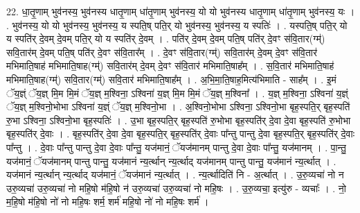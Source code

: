 \documentclass[17pt]{extarticle}
\begin{document}
22. धा॒तृ॒णाम् भुव॑नस्य॒ भुव॑नस्य धातृ॒णाम् धा॑तृ॒णाम् भुव॑नस्य॒ यो यो भुव॑नस्य धातृ॒णाम् धा॑तृ॒णाम् भुव॑नस्य॒ यः । . भुव॑नस्य॒ यो यो भुव॑नस्य॒ भुव॑नस्य॒ य स्पति॒ष् पति॒र् यो भुव॑नस्य॒ भुव॑नस्य॒ य स्पतिः॑ । . यस्पति॒ष् पति॒र् यो य स्पति॑र् दे॒वम् दे॒वम् पति॒र् यो य स्पति॑र् दे॒वम् । . पति॑र् दे॒वम् दे॒वम् पति॒ष् पति॑र् दे॒वꣳ स॑वि॒तार(ग्म्॑) सवि॒तार॑म् दे॒वम् पति॒ष् पति॑र् दे॒वꣳ स॑वि॒तार᳚म् । . दे॒वꣳ स॑वि॒तार(ग्म्॑) सवि॒तार॑म् दे॒वम् दे॒वꣳ स॑वि॒तार॑ मभिमाति॒षाह॑ मभिमाति॒षाह(ग्म्॑) सवि॒तार॑म् दे॒वम् दे॒वꣳ स॑वि॒तार॑ मभिमाति॒षाह᳚म् । . स॒वि॒तार॑ मभिमाति॒षाह॑ मभिमाति॒षाह(ग्म्॑) सवि॒तार(ग्म्॑) सवि॒तार॑ मभिमाति॒षाह᳚म् । . अ॒भि॒मा॒ति॒षाह॒मित्य॑भिमाति - साह᳚म् । . इ॒मं ॅय॒ज्ञ्ं ॅय॒ज्ञ् मि॒म मि॒मं ॅय॒ज्ञ् म॒श्विना॒ ऽश्विना॑ य॒ज्ञ् मि॒म मि॒मं ॅय॒ज्ञ् म॒श्विना᳚ । . य॒ज्ञ् म॒श्विना॒ ऽश्विना॑ य॒ज्ञ्ं ॅय॒ज्ञ् म॒श्विनो॒भोभा ऽश्विना॑ य॒ज्ञ्ं ॅय॒ज्ञ् म॒श्विनो॒भा । . अ॒श्विनो॒भोभा ऽश्विना॒ ऽश्विनो॒भा बृह॒स्पति॒र् बृह॒स्पति॑ रु॒भा ऽश्विना॒ ऽश्विनो॒भा बृह॒स्पतिः॑ । . उ॒भा बृह॒स्पति॒र् बृह॒स्पति॑ रु॒भोभा बृह॒स्पति॑र् दे॒वा दे॒वा बृह॒स्पति॑ रु॒भोभा बृह॒स्पति॑र् दे॒वाः । . बृह॒स्पति॑र् दे॒वा दे॒वा बृह॒स्पति॒र् बृह॒स्पति॑र् दे॒वाः पा᳚न्तु पान्तु दे॒वा बृह॒स्पति॒र् बृह॒स्पति॑र् दे॒वाः पा᳚न्तु । . दे॒वाः पा᳚न्तु पान्तु दे॒वा दे॒वाः पा᳚न्तु॒ यज॑मानं॒ ॅयज॑मानम् पान्तु दे॒वा दे॒वाः पा᳚न्तु॒ यज॑मानम् । . पा॒न्तु॒ यज॑मानं॒ ॅयज॑मानम् पान्तु पान्तु॒ यज॑मानं न्य॒र्त्थान् न्य॒र्त्थाद् यज॑मानम् पान्तु पान्तु॒ यज॑मानं न्य॒र्त्थात् । . यज॑मानं न्य॒र्त्थान् न्य॒र्त्थाद् यज॑मानं॒ ॅयज॑मानं न्य॒र्त्थात् । . न्य॒र्त्थादिति॑ नि - अ॒र्त्थात् । . उ॒रु॒व्यचा॑ नो न उरु॒व्यचा॑ उरु॒व्यचा॑ नो महि॒षो म॑हि॒षो न॑ उरु॒व्यचा॑ उरु॒व्यचा॑ नो महि॒षः । . उ॒रु॒व्यचा॒ इत्यु॑रु - व्यचाः᳚ । . नो॒ म॒हि॒षो म॑हि॒षो नो॑ नो महि॒षः शर्म॒ शर्म॑ महि॒षो नो॑ नो महि॒षः शर्म॑ । \newline
\end{document}
